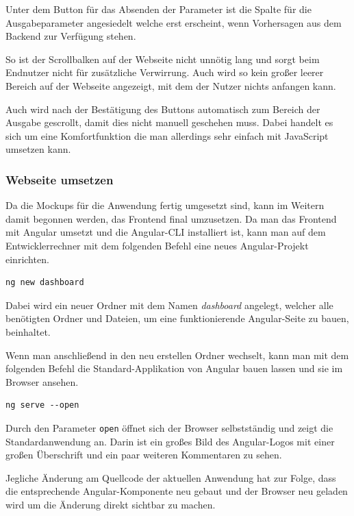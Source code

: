 Unter dem Button für das Absenden der Parameter ist die Spalte für die Ausgabeparameter angesiedelt welche erst
erscheint, wenn Vorhersagen aus dem Backend zur Verfügung stehen.

So ist der Scrollbalken auf der Webseite nicht unnötig lang und sorgt beim Endnutzer nicht für zusätzliche Verwirrung.
Auch wird so kein großer leerer Bereich auf der Webseite angezeigt, mit dem der Nutzer nichts anfangen kann.

Auch wird nach der Bestätigung des Buttons automatisch zum Bereich der Ausgabe gescrollt, damit dies nicht manuell
geschehen muss. Dabei handelt es sich um eine Komfortfunktion die man allerdings sehr einfach mit JavaScript umsetzen
kann.

\subsubsection{Webseite umsetzen}
Da die Mockups für die Anwendung fertig umgesetzt sind, kann im Weitern damit begonnen werden, das Frontend final
umzusetzen. Da man das Frontend mit Angular umsetzt und die Angular-CLI installiert ist, kann man auf dem
Entwicklerrechner mit dem folgenden Befehl eine neues Angular-Projekt einrichten.

\begin{lstlisting}[caption=Einrichten eines neuen Angular-Projektes, label=ls:umsetzung_angular]
    ng new dashboard
\end{lstlisting}

Dabei wird ein neuer Ordner mit dem Namen \textit{dashboard} angelegt, welcher alle benötigten Ordner und Dateien, um
eine funktionierende Angular-Seite zu bauen, beinhaltet.

Wenn man anschließend in den neu erstellen Ordner wechselt, kann man mit dem folgenden Befehl die Standard-Applikation
von Angular bauen lassen und sie im Browser ansehen.

\begin{lstlisting}[caption=Bereitstellen der Angular-Webseite, label=ls:umsetzung_angularserve]
    ng serve --open
\end{lstlisting}

Durch den Parameter \texttt{open} öffnet sich der Browser selbstständig und zeigt die Standardanwendung an. Darin ist
ein großes Bild des Angular-Logos mit einer großen Überschrift und ein paar weiteren Kommentaren zu sehen.

Jegliche Änderung am Quellcode der aktuellen Anwendung hat zur Folge, dass die entsprechende Angular-Komponente neu
gebaut und der Browser neu geladen wird um die Änderung direkt sichtbar zu machen.

